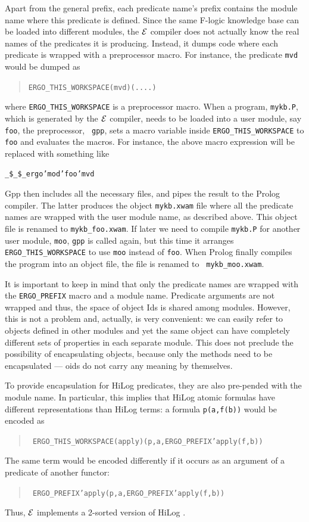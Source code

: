 \documentclass[11pt]{article}
\newcommand{\ERGO}{\mbox{\ensuremath{\cal{E}}\smaller{{\sc{RGO}}}}\xspace}
\newcommand{\FLSYSTEM}{\ERGO}
\newcommand{\fl}{\mbox{F-logic}\xspace}
\newcommand{\ofile}{xwam}
\begin{document}
Apart from the general prefix, each predicate name's prefix contains the module
name where this predicate is defined. Since the same \fl knowledge base
can be loaded into different modules, the \FLSYSTEM compiler does not actually
know the real names of the predicates it is producing. Instead, it dumps
code where each predicate is wrapped with a preprocessor macro. For
instance, the predicate {\tt mvd} would be dumped as
\begin{quote}
 \tt ERGO\_THIS\_WORKSPACE(mvd)(....)  
\end{quote}
where {\tt ERGO\_THIS\_WORKSPACE} is a preprocessor macro. 
When a program, {\tt mykb.P}, which is generated by the \FLSYSTEM compiler,
needs to be loaded into a user module, say {\tt foo}, the preprocessor, {\tt
  gpp}, sets a macro variable inside {\tt ERGO\_THIS\_WORKSPACE} to {\tt
  foo} and evaluates the macros.
For instance, the above macro expression will be replaced with something like
\begin{alltt}
 \_\$\_\$\_ergo'mod'foo'mvd  
\end{alltt}
Gpp then includes all the
necessary files, and pipes the result to the Prolog compiler. The latter
produces the object {\tt mykb.\ofile} file where all the predicate names are
wrapped with the user module name, as described above.  This object file is
renamed to {\tt mykb\_foo.\ofile}. If later we need to compile {\tt mykb.P}
for another user module, {\tt moo}, {\tt gpp} is called again, but this time it
arranges {\tt ERGO\_THIS\_WORKSPACE} to use \texttt{moo} instead of
{\tt foo}. When Prolog finally compiles
the program into an object file, the file is renamed to {\tt
  mykb\_moo.\ofile}.

It is important to keep in mind that only the predicate names are wrapped
with the {\tt ERGO\_PREFIX} macro and a module name. Predicate arguments
are not wrapped and thus, the space of object Ids is shared among modules.
However, this is not a problem and, actually, is very convenient: we can
easily refer to objects defined in other modules and yet the same object
can have completely different sets of properties in each separate module.
This does not preclude the possibility of encapsulating objects, because
only the methods need to be encapsulated --- oids do not carry any meaning
by themselves.

To provide encapsulation for HiLog predicates, they are also pre-pended with
the module name. In particular, this implies that HiLog atomic formulas
have different representations than HiLog terms: a formula {\tt p(a,f(b))}
would be encoded as
\begin{quote}
 \tt
 ERGO\_THIS\_WORKSPACE(apply)(p,a,ERGO\_PREFIX'apply(f,b))  
\end{quote}
The same term would be encoded differently if it occurs as an argument of a
predicate of another functor:
\begin{quote}
 \tt
 ERGO\_PREFIX'apply(p,a,ERGO\_PREFIX'apply(f,b))    
\end{quote}
Thus, \FLSYSTEM implements a 2-sorted version of HiLog \cite{hilog-icdt-95}.
\end{document}
